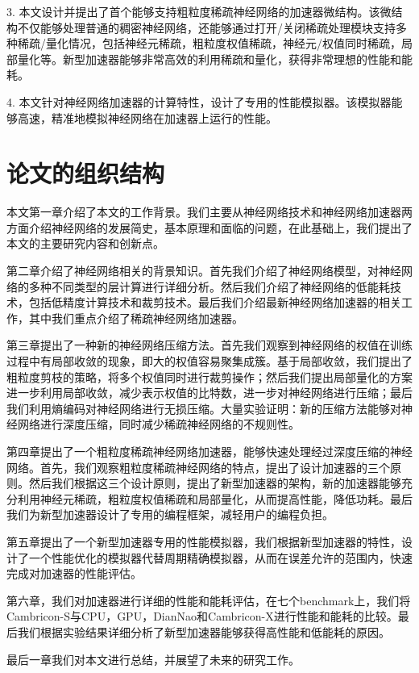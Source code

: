 3. 本文设计并提出了首个能够支持粗粒度稀疏神经网络的加速器微结构。该微结构不仅能够处理普通的稠密神经网络，还能够通过打开/关闭稀疏处理模块支持多种稀疏/量化情况，包括神经元稀疏，粗粒度权值稀疏，神经元/权值同时稀疏，局部量化等。新型加速器能够非常高效的利用稀疏和量化，获得非常理想的性能和能耗。

4. 本文针对神经网络加速器的计算特性，设计了专用的性能模拟器。该模拟器能够高速，精准地模拟神经网络在加速器上运行的性能。

\section{论文的组织结构}
本文第一章介绍了本文的工作背景。我们主要从神经网络技术和神经网络加速器两方面介绍神经网络的发展简史，基本原理和面临的问题，在此基础上，我们提出了本文的主要研究内容和创新点。

第二章介绍了神经网络相关的背景知识。首先我们介绍了神经网络模型，对神经网络的多种不同类型的层计算进行详细分析。然后我们介绍了神经网络的低能耗技术，包括低精度计算技术和裁剪技术。最后我们介绍最新神经网络加速器的相关工作，其中我们重点介绍了稀疏神经网络加速器。

第三章提出了一种新的神经网络压缩方法。首先我们观察到神经网络的权值在训练过程中有局部收敛的现象，即大的权值容易聚集成簇。基于局部收敛，我们提出了粗粒度剪枝的策略，将多个权值同时进行裁剪操作；然后我们提出局部量化的方案进一步利用局部收敛，减少表示权值的比特数，进一步对神经网络进行压缩；最后我们利用熵编码对神经网络进行无损压缩。大量实验证明：新的压缩方法能够对神经网络进行深度压缩，同时减少稀疏神经网络的不规则性。

第四章提出了一个粗粒度稀疏神经网络加速器，能够快速处理经过深度压缩的神经网络。首先，我们观察粗粒度稀疏神经网络的特点，提出了设计加速器的三个原则。然后我们根据这三个设计原则，提出了新型加速器的架构，新的加速器能够充分利用神经元稀疏，粗粒度权值稀疏和局部量化，从而提高性能，降低功耗。最后我们为新型加速器设计了专用的编程框架，减轻用户的编程负担。

第五章提出了一个新型加速器专用的性能模拟器，我们根据新型加速器的特性，设计了一个性能优化的模拟器代替周期精确模拟器，从而在误差允许的范围内，快速完成对加速器的性能评估。

第六章，我们对加速器进行详细的性能和能耗评估，在七个benchmark上，我们将Cambricon-S与CPU，GPU，DianNao和Cambricon-X进行性能和能耗的比较。最后我们根据实验结果详细分析了新型加速器能够获得高性能和低能耗的原因。

最后一章我们对本文进行总结，并展望了未来的研究工作。
